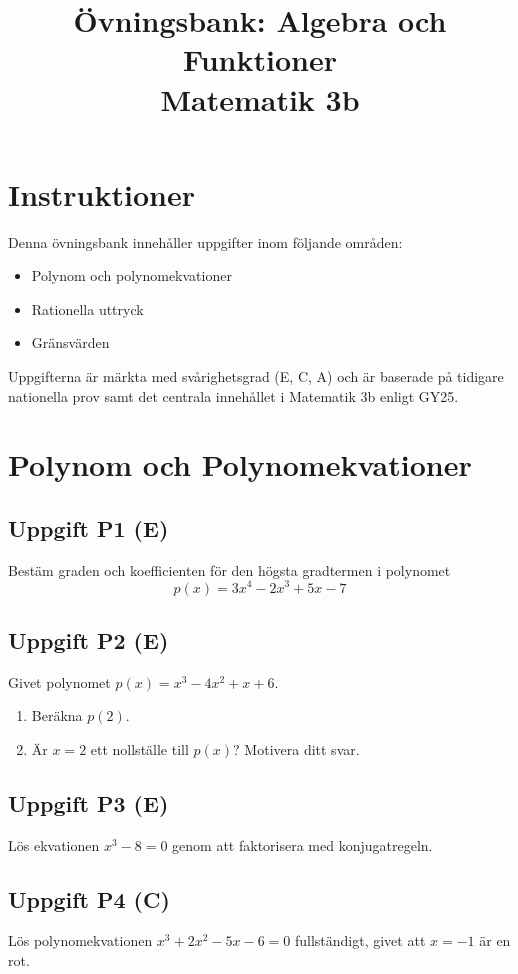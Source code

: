 \documentclass[12pt]{article}
\title{Övningsbank: Algebra och Funktioner \\ \large Matematik 3b}
\author{}
\date{}
\begin{document}
\maketitle

\section*{Instruktioner}
Denna övningsbank innehåller uppgifter inom följande områden:
\begin{itemize}
    \item Polynom och polynomekvationer
    \item Rationella uttryck
    \item Gränsvärden
\end{itemize}

Uppgifterna är märkta med svårighetsgrad (E, C, A) och är baserade på tidigare nationella prov samt det centrala innehållet i Matematik 3b enligt GY25.

\newpage

\section{Polynom och Polynomekvationer}

\subsection*{Uppgift P1 (E)}
Bestäm graden och koefficienten för den högsta gradtermen i polynomet
\[
p(x) = 3x^4 - 2x^3 + 5x - 7
\]

\subsection*{Uppgift P2 (E)}
Givet polynomet $p(x) = x^3 - 4x^2 + x + 6$.
\begin{enumerate}[label=\alph*)]
    \item Beräkna $p(2)$.
    \item Är $x = 2$ ett nollställe till $p(x)$? Motivera ditt svar.
\end{enumerate}

\subsection*{Uppgift P3 (E)}
Lös ekvationen $x^3 - 8 = 0$ genom att faktorisera med konjugatregeln.

\subsection*{Uppgift P4 (C)}
Lös polynomekvationen $x^3 + 2x^2 - 5x - 6 = 0$ fullständigt, givet att $x = -1$ är en rot.
\end{document}
